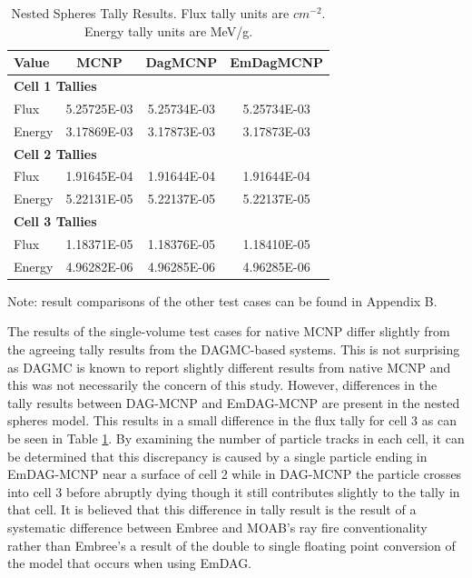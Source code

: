 \documentclass[10pt, a4paper]{article}
\begin{document}
\begin{table}[H]
  \small
  \begin{center}
    \caption{Nested Spheres Tally Results. Flux tally units are $cm^{-2}$. Energy tally units are MeV/g.}
    \label{nestedspheres}
    \begin{tabular}{lccc}
      \toprule
      Value & MCNP & DagMCNP & EmDagMCNP \\
      \toprule
      \multicolumn{4}{l}{\textbf{Cell 1 Tallies}} \\
      \hline
      Flux  & 5.25725E-03 & 5.25734E-03 & 5.25734E-03 \\
      Energy  & 3.17869E-03 &  3.17873E-03 &  3.17873E-03 \\
      \hline
      \multicolumn{4}{l}{\textbf{Cell 2 Tallies}} \\
      \hline
      Flux  & 1.91645E-04 & 1.91644E-04 & 1.91644E-04 \\
      Energy  & 5.22131E-05 & 5.22137E-05 & 5.22137E-05 \\
      \hline
      \multicolumn{4}{l}{\textbf{Cell 3 Tallies}} \\
      \hline
      Flux  & 1.18371E-05 & 1.18376E-05 & 1.18410E-05 \\
      Energy  & 4.96282E-06 & 4.96285E-06 & 4.96285E-06 \\
      \bottomrule
                        
    \end{tabular}

  \end{center}
\end{table}

Note: result comparisons of the other test cases can be found in Appendix B.

The results of the single-volume test cases for native MCNP differ slightly from the agreeing tally results from the DAGMC-based systems. This is not surprising as DAGMC is known to report slightly different results from native MCNP and this was not necessarily the concern of this study. However, differences in the tally results between DAG-MCNP and EmDAG-MCNP are present in the nested spheres model. This results in a small difference in the flux tally for cell 3 as can be seen in Table \ref{nestedspheres}. By examining the number of particle tracks in each cell, it can be determined that this discrepancy is caused by a single particle ending in EmDAG-MCNP near a surface of cell 2 while in DAG-MCNP the particle crosses into cell 3 before abruptly dying though it still contributes slightly to the tally in that cell. It is believed that this difference in tally result is the result of a systematic difference between Embree and MOAB's ray fire conventionality rather than Embree's a result of the double to single floating point conversion of the model that occurs when using EmDAG.
\end{document}
